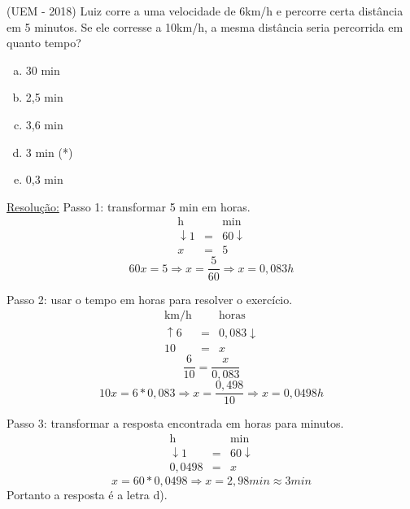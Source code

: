 \begin{exem}
 (UEM - 2018) Luiz corre a uma velocidade de 6km/h e percorre certa distância em 5 minutos. Se ele corresse a 10km/h, a mesma distância seria percorrida em quanto tempo?
 \begin{enumerate}[a)]
  \item 30 min
  \item 2,5 min
  \item 3,6 min
  \item 3 min (*)
  \item 0,3 min
 \end{enumerate}

 \underline{Resolução:}
 Passo 1: transformar 5 min em horas.
  \begin{eqnarray*}
   \text{h} & & \text{min} \\
    \downarrow 1 & = & 60 \downarrow \\
   x & = & 5
  \end{eqnarray*}
\begin{equation}
60x=5 \Rightarrow x=\frac{5}{60} \Rightarrow x= 0,083 h
\end{equation}

 Passo 2: usar o tempo em horas para resolver o exercício.
   \begin{eqnarray*}
   \text{km/h} & & \text{horas} \\
   \uparrow 6 & = & 0,083 \downarrow \\
   10 & = & x
  \end{eqnarray*}
\begin{equation}
\frac{6}{10}=\frac{x}{0,083}
\end{equation}
\begin{equation}
10x=6*0,083 \Rightarrow x=\frac{0,498}{10} \Rightarrow x= 0,0498 h
\end{equation}

 Passo 3: transformar a resposta encontrada em horas para minutos.
  \begin{eqnarray*}
   \text{h} & & \text{min} \\
    \downarrow 1 & = & 60 \downarrow \\
   0,0498 & = & x
  \end{eqnarray*}
\begin{equation}
x= 60* 0,0498 \Rightarrow x= 2,98 min \approx 3 min
\end{equation}
  Portanto a resposta é a letra d).

\end{exem}


